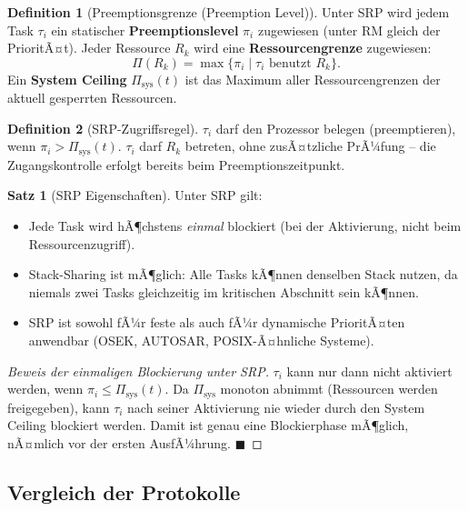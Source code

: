 ﻿\documentclass[a4paper,12pt]{report}
\theoremstyle{definition}
\newtheorem{definition}{Definition}[chapter]
\newtheorem{satz}{Satz}[chapter]
\begin{document}
\begin{definition}[Preemptionsgrenze (Preemption Level)]
	Unter SRP wird jedem Task $\tau_i$ ein statischer \textbf{Preemptionslevel}
	$\pi_i$ zugewiesen (unter RM gleich der PrioritÃ¤t). Jeder Ressource $R_k$ wird
	eine \textbf{Ressourcengrenze} zugewiesen:
	\[
		\Pi(R_k) = \max\{\pi_i \mid \tau_i \text{ benutzt } R_k\}.
	\]
	Ein \textbf{System Ceiling} $\Pi_{\text{sys}}(t)$ ist das Maximum aller
	Ressourcengrenzen der aktuell gesperrten Ressourcen.
\end{definition}

\begin{definition}[SRP-Zugriffsregel]
	$\tau_i$ darf den Prozessor belegen (preemptieren), wenn $\pi_i > \Pi_{\text{sys}}(t)$.
	$\tau_i$ darf $R_k$ betreten, ohne zusÃ¤tzliche PrÃ¼fung -- die Zugangskontrolle
	erfolgt bereits beim Preemptionszeitpunkt.
\end{definition}

\begin{satz}[SRP Eigenschaften]
	Unter SRP gilt:
	\begin{itemize}
		\item Jede Task wird hÃ¶chstens \emph{einmal} blockiert (bei der Aktivierung,
		      nicht beim Ressourcenzugriff).
		\item Stack-Sharing ist mÃ¶glich: Alle Tasks kÃ¶nnen denselben Stack nutzen,
		      da niemals zwei Tasks gleichzeitig im kritischen Abschnitt sein kÃ¶nnen.
		\item SRP ist sowohl fÃ¼r feste als auch fÃ¼r dynamische PrioritÃ¤ten anwendbar
		      (OSEK, AUTOSAR, POSIX-Ã¤hnliche Systeme).
	\end{itemize}
\end{satz}

\begin{proof}[Beweis der einmaligen Blockierung unter SRP]
	$\tau_i$ kann nur dann nicht aktiviert werden, wenn $\pi_i \leq \Pi_{\text{sys}}(t)$.
	Da $\Pi_{\text{sys}}$ monoton abnimmt (Ressourcen werden freigegeben), kann
	$\tau_i$ nach seiner Aktivierung nie wieder durch den System Ceiling blockiert
	werden. Damit ist genau eine Blockierphase mÃ¶glich, nÃ¤mlich vor der ersten
	AusfÃ¼hrung. \hfill$\blacksquare$
\end{proof}

\subsection{Vergleich der Protokolle}
\end{document}
